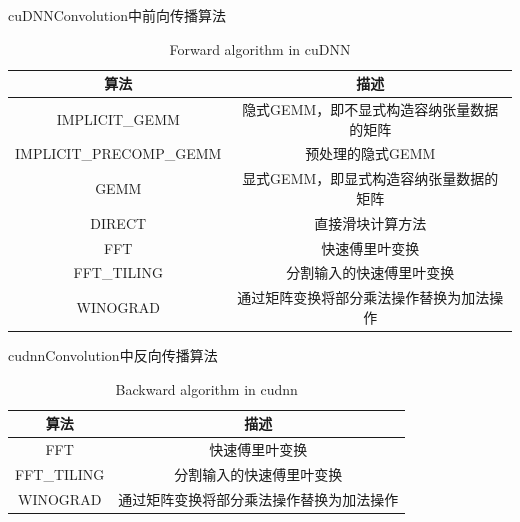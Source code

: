 \begin{table}
	\centering
	\renewcommand{\thetable}{\arabic{section}-\arabic{table} }
	\renewcommand{\tablename}{表}
	\caption{cuDNNConvolution中前向传播算法}
	\addtocounter{table}{-1}
	\renewcommand{\thetable}{\arabic{section}-\arabic{table} }
	\renewcommand{\tablename}{Table}
	\caption{Forward algorithm in cuDNN}
	\begin{tabular}{cc}
		\toprule
		算法 & 描述\\
		\midrule
		IMPLICIT\_GEMM & 隐式GEMM，即不显式构造容纳张量数据的矩阵\\
		IMPLICIT\_PRECOMP\_GEMM & 预处理的隐式GEMM\\
		GEMM & 显式GEMM，即显式构造容纳张量数据的矩阵\\
		DIRECT & 直接滑块计算方法\\
		FFT & 快速傅里叶变换\\
		FFT\_TILING & 分割输入的快速傅里叶变换\\
		WINOGRAD & 通过矩阵变换将部分乘法操作替换为加法操作\\
		\bottomrule
	\end{tabular} \label{table-FWDALGO} 
\end{table}
\begin{table}
	\centering
	\renewcommand{\thetable}{\arabic{section}-\arabic{table} }
	\renewcommand{\tablename}{表}
	\caption{cudnnConvolution中反向传播算法}
	\addtocounter{table}{-1}
	\renewcommand{\thetable}{\arabic{section}-\arabic{table} }
	\renewcommand{\tablename}{Table}
	\caption{Backward algorithm in cudnn}
	\begin{tabular}{cc}
		\toprule
		算法 & 描述\\
		\midrule
		FFT & 快速傅里叶变换\\
		FFT\_TILING & 分割输入的快速傅里叶变换\\
		WINOGRAD & 通过矩阵变换将部分乘法操作替换为加法操作\\
		\bottomrule
	\end{tabular} \label{table-BWDALGO} 
\end{table}
